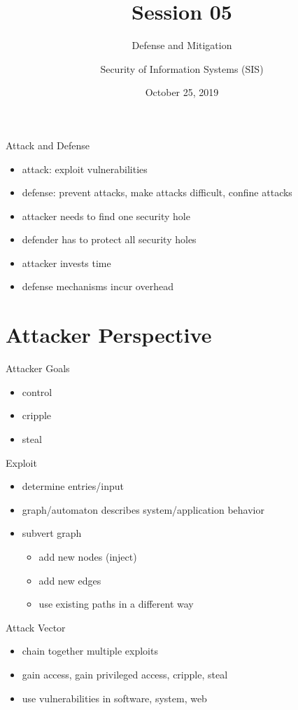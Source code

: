 \documentclass{curs}
\title[Session 05]{Session 05}
\subtitle{Defense and Mitigation}
\author{Security of Information Systems (SIS)}
\date{October 25, 2019}
\begin{document}
\frame{\titlepage}

\begin{frame}{Attack and Defense}
  \begin{itemize}
    \item attack: exploit vulnerabilities
    \item defense: prevent attacks, make attacks difficult, confine attacks
    \item attacker needs to find one security hole
    \item defender has to protect all security holes
    \item attacker invests time
    \item defense mechanisms incur overhead
  \end{itemize}
\end{frame}


\section{Attacker Perspective}

\begin{frame}{Attacker Goals}
  \begin{itemize}
    \item control
    \item cripple
    \item steal
  \end{itemize}
\end{frame}

\begin{frame}{Exploit}
  \begin{itemize}
    \item determine entries/input
    \item graph/automaton describes system/application behavior
    \item subvert graph
      \begin{itemize}
        \item add new nodes (inject)
        \item add new edges
        \item use existing paths in a different way
      \end{itemize}
  \end{itemize}
\end{frame}

\begin{frame}{Attack Vector}
  \begin{itemize}
    \item chain together multiple exploits
    \item gain access, gain privileged access, cripple, steal
    \item use vulnerabilities in software, system, web
  \end{itemize}
\end{frame}
\end{document}
